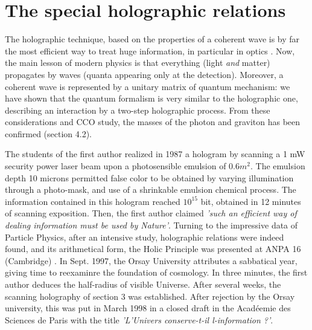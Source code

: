 \documentclass[twoside,draft]{article}
\begin{document}
\begin{sloppypar}
\section{The special holographic relations}

The holographic technique, based on the properties of a coherent wave is by far the most efficient way to treat huge information, in particular in optics \cite{Grosmann}. Now, the main lesson of modern physics is that everything (light \textit{and} matter) propagates by waves (quanta appearing only at the detection). Moreover, a coherent wave is represented by a unitary matrix of quantum mechanism: we have shown that the quantum formalism is very similar to the holographic one, describing an interaction by a two-step holographic process. From these considerations and CCO study, the masses of the photon and graviton has been confirmed (section 4.2).

The students of the first author realized in 1987 a hologram by scanning a 1 mW security power laser beam upon a photosensible emulsion of $0.6 m^2$. The emulsion depth 10 microns permitted false color to be obtained by varying illumination through a photo-mask, and use of a shrinkable emulsion chemical process. The information contained in this hologram reached $10^15$ bit,  obtained in 12 minutes of scanning exposition. Then, the first author claimed \textit{'such an efficient way of dealing information must be used by Nature'}. Turning to the impressive data of Particle Physics, after an intensive study, holographic relations were indeed found, and its arithmetical form, the Holic Principle was presented at ANPA 16 (Cambridge) \cite{Sanchez4}. In Sept. 1997, the Orsay University attributes a sabbatical year, giving time to reexaminre the foundation of cosmology. In three minutes, the first author deduces the half-radius of visible Universe. After several weeks, the scanning holography of section 3 was established. After rejection by the Orsay university, this was put in March 1998 in a closed draft in the Acad\'{e}emie des Sciences de Paris with the title \textit{ 'L'Univers conserve-t-il l-information ?'}.


\end{sloppypar}
\end{document}
